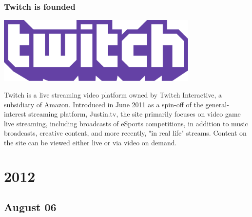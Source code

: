 \documentclass[11pt]{report}
\begin{document}
\subsection{Twitch is founded}
\vspace{2mm}\begin{center}\includegraphics[width=10cm]{./img/twitch.png}\end{center}
Twitch is a live streaming video platform owned by Twitch Interactive, a subsidiary of Amazon. Introduced in June 2011 as a spin-off of the general-interest streaming platform, Justin.tv, the site primarily focuses on video game live streaming, including broadcasts of eSports competitions, in addition to music broadcasts, creative content, and more recently, "in real life" streams. Content on the site can be viewed either live or via video on demand.

\chapter{2012}

\section{August 06}
\end{document}
